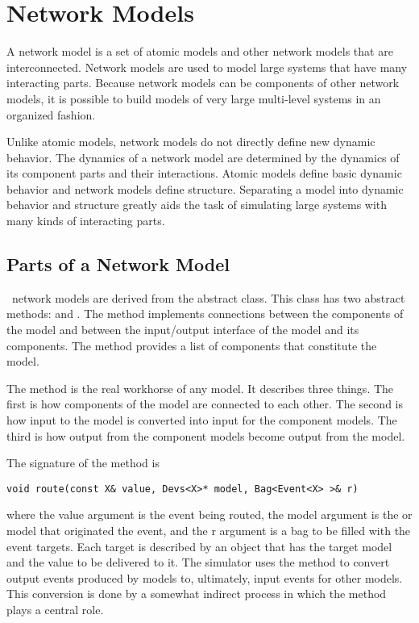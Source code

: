 \chapter{Network Models}
\label{chapter:network_models}

A network model is a set of atomic models and other network models that are interconnected. Network models are used to model large systems that have many interacting parts. Because network models can be components of other network models, it is possible to build models of very large multi-level systems in an organized fashion.

Unlike atomic models, network models do not directly define new dynamic behavior. The dynamics of a network model are determined by the dynamics of its component parts and their interactions. Atomic models define basic dynamic behavior and network models define structure. Separating a model into dynamic behavior and structure greatly aids the task of simulating large systems with many kinds of interacting parts.

\section{Parts of a Network Model}
\label{section:parts_of_a_network_model}
\adevs\ network models are derived from the abstract  class. This class has two abstract methods:  and . The  method implements connections between the components of the  model and between the input/output interface of the  model and its components. The  method provides a list of components that constitute the  model.

The  method is the real workhorse of any  model. It describes three things. The first is how components of the  model are connected to each other. The second is how input to the  model is converted into input for the component models. The third is how output from the component models become output from the  model. 

The signature of the  method is
\begin{verbatim}
void route(const X& value, Devs<X>* model, Bag<Event<X> >& r) 
\end{verbatim}
where the value argument is the event being routed, the model argument is the  or  model that originated the event, and the r argument is a bag to be filled with the event targets. Each target is described by an  object that has the target model and the value to be delivered to it.
The simulator uses the  method to convert output events produced by  models to, ultimately, input events for other  models. This conversion is done by a somewhat indirect process in which the  method plays a central role.


